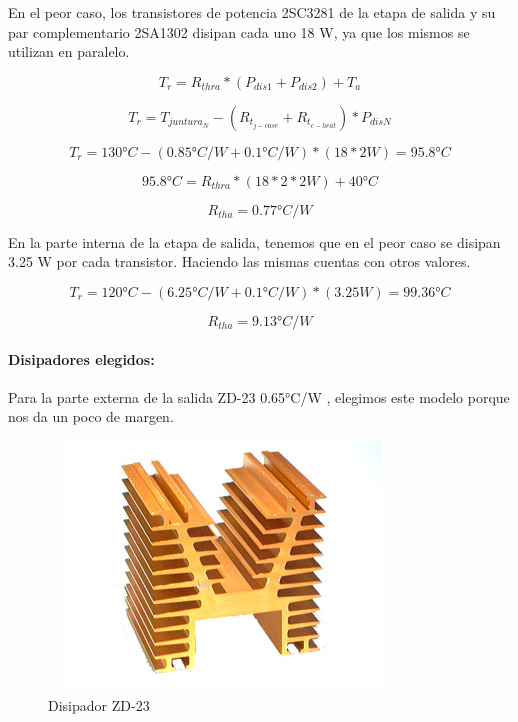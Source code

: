 \documentclass[a4paper,12pt,twoside]{article}
\begin{document}
En el peor caso, los transistores de potencia 2SC3281 de la etapa de salida y su par complementario 2SA1302
disipan cada uno 18 W, ya que los mismos se utilizan en paralelo.

\begin{equation*}
T_r = R_{thra} * (P_{dis1}+P_{dis2}) + T_a
\end{equation*}

\begin{equation*}
T_r = T_{juntura_{N}} - (R_{t_{j-case}}+R_{t_{c-heat}})*P_{disN}
\end{equation*}

\begin{equation*}
T_r = 130°C - (0.85 °C/W + 0.1 °C/W)*(18*2 W) = 95.8 °C
\end{equation*}

\begin{equation*}
95.8°C = R_{thra}*(18*2*2 W) + 40°C
\end{equation*}

\begin{equation*}
R_{tha} = 0.77 °C/W
\end{equation*}

En la  parte interna de la etapa de salida, tenemos que en el peor caso se disipan 3.25  W por cada transistor.
Haciendo las mismas cuentas con otros valores.


\begin{equation*}
T_r = 120°C - (6.25°C/W + 0.1°C/W)*(3.25W) = 99.36 °C
\end{equation*}

\begin{equation*}
R_{tha} = 9.13 °C/W
\end{equation*}

\paragraph{Disipadores elegidos:}

Para la parte externa de la salida ZD-23 0.65°C/W , elegimos este modelo porque nos da un poco de margen.

\begin{figure}[H]
    \centering
    \includegraphics[height=0.4\textwidth]{img/zd23.jpg}
    \caption{Disipador ZD-23}
    \label{fig:diszd23}
\end{figure}
\end{document}
